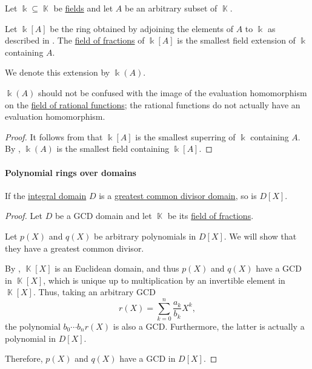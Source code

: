 \begin{proposition}\label{thm:adjoining_elements_to_field}
  Let \( \Bbbk \subseteq \BbbK \) be \hyperref[def:field]{fields} and let \( A \) be an arbitrary subset of \( \BbbK \).

  Let \( \Bbbk[A] \) be the ring obtained by adjoining the elements of \( A \) to \( \Bbbk \) as described in . The \hyperref[thm:field_of_fractions]{field of fractions} of \( \Bbbk[A] \) is the smallest field extension of \( \Bbbk \) containing \( A \).

  We denote this extension by \( \Bbbk(A) \).
\end{proposition}
\begin{comments}
  \item \( \Bbbk(A) \) should not be confused with the image of the evaluation homomorphism on the \hyperref[def:rational_function_field]{field of rational functions}; the rational functions do not actually have an evaluation homomorphism.
\end{comments}
\begin{proof}
  It follows from  that \( \Bbbk[A] \) is the smallest superring of \( \Bbbk \) containing \( A \). By , \( \Bbbk(A) \) is the smallest field containing \( \Bbbk[A] \).
\end{proof}

\paragraph{Polynomial rings over domains}

\begin{proposition}\label{thm:polynomial_ring_over_gcd_domain}
  If the \hyperref[def:integral_domain]{integral domain} \( D \) is a \hyperref[def:gcd_domain]{greatest common divisor domain}, so is \( D[X] \).
\end{proposition}
\begin{proof}
  Let \( D \) be a GCD domain and let \( \BbbK \) be its \hyperref[thm:field_of_fractions]{field of fractions}.

  Let \( p(X) \) and \( q(X) \) be arbitrary polynomials in \( D[X] \). We will show that they have a greatest common divisor.

  By , \( \BbbK[X] \) is an Euclidean domain, and thus \( p(X) \) and \( q(X) \) have a GCD in \( \BbbK[X] \), which is unique up to multiplication by an invertible element in \( \BbbK[X] \). Thus, taking an arbitrary GCD
  \begin{equation*}
    r(X) = \sum_{k=0}^n \frac {a_k} {b_k} X^k,
  \end{equation*}
  the polynomial \( b_0 \cdots b_n r(X) \) is also a GCD. Furthermore, the latter is actually a polynomial in \( D[X] \).

  Therefore, \( p(X) \) and \( q(X) \) have a GCD in \( D[X] \).
\end{proof}

